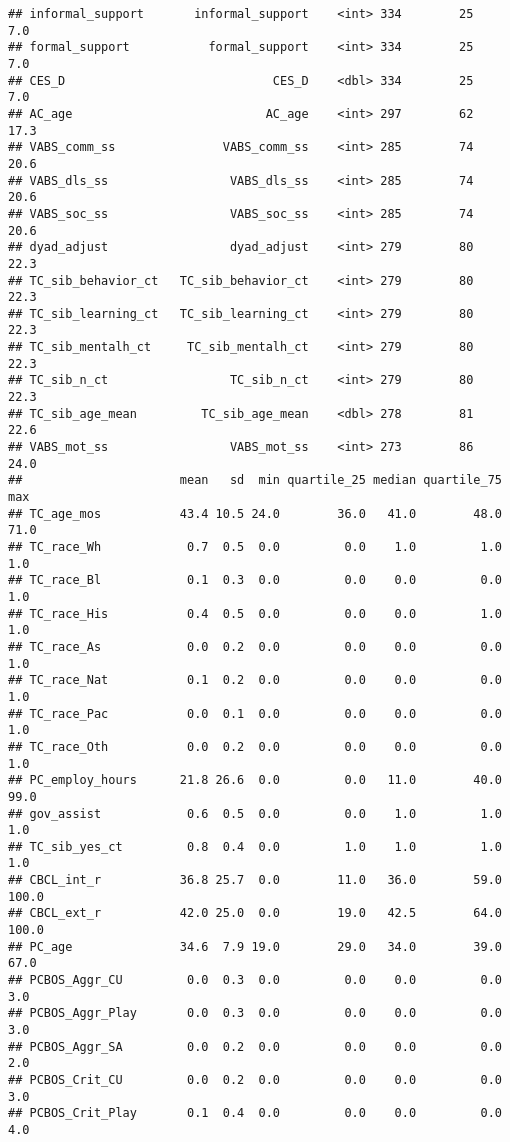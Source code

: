 \documentclass[
]{article}
\begin{document}
\begin{verbatim}
## informal_support       informal_support    <int> 334        25             7.0
## formal_support           formal_support    <int> 334        25             7.0
## CES_D                             CES_D    <dbl> 334        25             7.0
## AC_age                           AC_age    <int> 297        62            17.3
## VABS_comm_ss               VABS_comm_ss    <int> 285        74            20.6
## VABS_dls_ss                 VABS_dls_ss    <int> 285        74            20.6
## VABS_soc_ss                 VABS_soc_ss    <int> 285        74            20.6
## dyad_adjust                 dyad_adjust    <int> 279        80            22.3
## TC_sib_behavior_ct   TC_sib_behavior_ct    <int> 279        80            22.3
## TC_sib_learning_ct   TC_sib_learning_ct    <int> 279        80            22.3
## TC_sib_mentalh_ct     TC_sib_mentalh_ct    <int> 279        80            22.3
## TC_sib_n_ct                 TC_sib_n_ct    <int> 279        80            22.3
## TC_sib_age_mean         TC_sib_age_mean    <dbl> 278        81            22.6
## VABS_mot_ss                 VABS_mot_ss    <int> 273        86            24.0
##                      mean   sd  min quartile_25 median quartile_75   max
## TC_age_mos           43.4 10.5 24.0        36.0   41.0        48.0  71.0
## TC_race_Wh            0.7  0.5  0.0         0.0    1.0         1.0   1.0
## TC_race_Bl            0.1  0.3  0.0         0.0    0.0         0.0   1.0
## TC_race_His           0.4  0.5  0.0         0.0    0.0         1.0   1.0
## TC_race_As            0.0  0.2  0.0         0.0    0.0         0.0   1.0
## TC_race_Nat           0.1  0.2  0.0         0.0    0.0         0.0   1.0
## TC_race_Pac           0.0  0.1  0.0         0.0    0.0         0.0   1.0
## TC_race_Oth           0.0  0.2  0.0         0.0    0.0         0.0   1.0
## PC_employ_hours      21.8 26.6  0.0         0.0   11.0        40.0  99.0
## gov_assist            0.6  0.5  0.0         0.0    1.0         1.0   1.0
## TC_sib_yes_ct         0.8  0.4  0.0         1.0    1.0         1.0   1.0
## CBCL_int_r           36.8 25.7  0.0        11.0   36.0        59.0 100.0
## CBCL_ext_r           42.0 25.0  0.0        19.0   42.5        64.0 100.0
## PC_age               34.6  7.9 19.0        29.0   34.0        39.0  67.0
## PCBOS_Aggr_CU         0.0  0.3  0.0         0.0    0.0         0.0   3.0
## PCBOS_Aggr_Play       0.0  0.3  0.0         0.0    0.0         0.0   3.0
## PCBOS_Aggr_SA         0.0  0.2  0.0         0.0    0.0         0.0   2.0
## PCBOS_Crit_CU         0.0  0.2  0.0         0.0    0.0         0.0   3.0
## PCBOS_Crit_Play       0.1  0.4  0.0         0.0    0.0         0.0   4.0

\end{verbatim}
\end{document}
